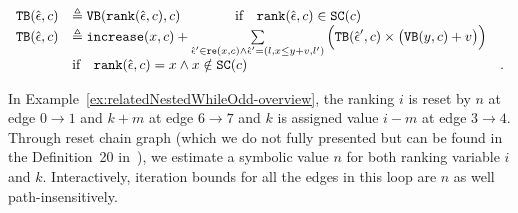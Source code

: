 \begin{defn}
{%
\[ 
\begin{array}{lll}
  {\ensuremath{\mathtt{TB}}}(\hat{\mathtt{\epsilon}{}}, c) 
  & \triangleq {\ensuremath{\mathtt{VB}}}(\mathtt{rank}(\hat{\mathtt{\epsilon}{}}, c), c)   \qquad \qquad  \text{if} \quad  \mathtt{rank}(\hat{\mathtt{\epsilon}{}}, c) \in \mathtt{SC}(c)  & \\
  {\mathtt{TB}}(\hat{\mathtt{\epsilon}{}}, c) 
  & \triangleq \mathtt{increase}(x, c) 
   + 
  \sum\limits_{\hat{\mathtt{\epsilon}{}}' \in \mathtt{re}(x, c) \land \hat{\mathtt{\epsilon}{}}' = (l, x \leq y + v, l') }
  \Big( {\mathtt{TB}}(\hat{\mathtt{\epsilon}{}}', c) \times \big( {\mathtt{VB}}(y, c) + v \big) \Big)
  & \\
  &  \text{if} \quad  \mathtt{rank}(\hat{\mathtt{\epsilon}{}}, c) = x \land x \notin \mathtt{SC}(c)  &.
\end{array}
  \]
}
\end{defn}
In Example~\ref{ex:relatedNestedWhileOdd-overview}, the ranking $i$ is reset by $n$ at edge $0 \to 1$ and 
$k + m$ at edge $6 \to 7$ and $k$ is assigned value $i - m$ at edge $3 \to 4$. Through reset chain graph (which we do not fully presented but can be found in the Definition~20 in~\cite{SinnZV17}), we estimate a symbolic value $n$ for both ranking variable $i$ and $k$.
Interactively, iteration bounds for all the edges in this loop are $n$ as well path-insensitively.